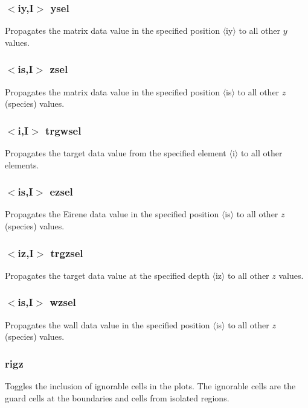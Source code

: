 \documentclass[a4paper,10pt]{report}
\begin{document}
\subsubsection{$<$iy,{\bf I}$>$ ysel}\label{sec:ysel}
Propagates the matrix data value in the specified position $\langle$iy$\rangle$ to all other $y$ values.

\subsubsection{$<$is,{\bf I}$>$ zsel}\label{sec:zsel}
Propagates the matrix data value in the specified position $\langle$is$\rangle$ to all other $z$
(species) values.

\subsubsection{$<$i,{\bf I}$>$ trgwsel}\label{sec:trgwsel}
Propagates the target data value from the specified element $\langle$i$\rangle$ to all other elements.

\subsubsection{$<$is,{\bf I}$>$ ezsel}\label{sec:ezsel}
Propagates the Eirene data value in the specified position $\langle$is$\rangle$ to all other $z$
(species) values.

\subsubsection{$<$iz,{\bf I}$>$ trgzsel}\label{sec:trgzsel}
Propagates the target data value at the specified depth $\langle$iz$\rangle$ to all other $z$ values.

\subsubsection{$<$is,{\bf I}$>$ wzsel}\label{sec:wzsel}
Propagates the wall data value in the specified position $\langle$is$\rangle$ to all other $z$
(species) values.

\subsubsection{rigz}\label{sec:rigz}
Toggles the inclusion of ignorable cells in the plots. The ignorable cells
are the guard cells at the boundaries and cells from isolated regions.
\end{document}
